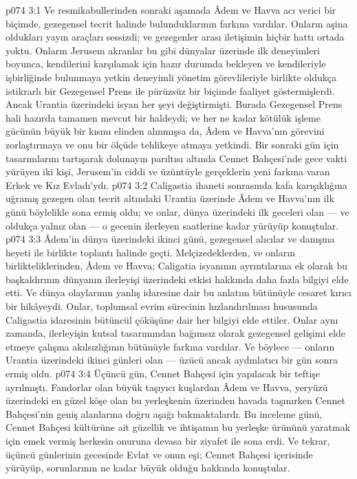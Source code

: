 \vs p074 3:1 Ve resmikabullerinden sonraki aşamada Âdem ve Havva acı verici bir biçimde, gezegensel tecrit halinde bulunduklarının farkına vardılar. Onların aşina oldukları yayın araçları sessizdi; ve gezegenler arası iletişimin hiçbir hattı ortada yoktu. Onların Jerusem akranlar bu gibi dünyalar üzerinde ilk deneyimleri boyunca, kendilerini karşılamak için hazır durumda bekleyen ve kendileriyle işbirliğinde bulunmaya yetkin deneyimli yönetim görevlileriyle birlikte oldukça istikrarlı bir Gezegensel Prens ile pürüzsüz bir biçimde faaliyet göstermişlerdi. Ancak Urantia üzerindeki isyan her şeyi değiştirmişti. Burada Gezegensel Prens hali hazırda tamamen mevcut bir haldeydi; ve her ne kadar kötülük işleme gücünün büyük bir kısmı elinden alınmışsa da, Âdem ve Havva’nın görevini zorlaştırmaya ve onu bir ölçüde tehlikeye atmaya yetkindi. Bir sonraki gün için tasarımlarını tartışarak dolunayın parıltısı altında Cennet Bahçesi’nde gece vakti yürüyen iki kişi, Jerusem’in ciddi ve üzüntüyle gerçeklerin yeni farkına varan Erkek ve Kız Evladı’ydı.
\vs p074 3:2 Caligastia ihaneti sonrasında kafa karışıklığına uğramış gezegen olan tecrit altındaki Urantia üzerinde Âdem ve Havva’nın ilk günü böylelikle sona ermiş oldu; ve onlar, dünya üzerindeki ilk geceleri olan --- ve oldukça yalnız olan --- o gecenin ilerleyen saatlerine kadar yürüyüp konuştular.
\vs p074 3:3 Âdem’in dünya üzerindeki ikinci günü, gezegensel alıcılar ve danışma heyeti ile birlikte toplantı halinde geçti. Melçizedeklerden, ve onların birlikteliklerinden, Âdem ve Havva; Caligatia isyanının ayrıntılarına ek olarak bu başkaldırının dünyanın ilerleyişi üzerindeki etkisi hakkında daha fazla bilgiyi elde etti. Ve dünya olaylarının yanlış idaresine dair bu anlatım bütünüyle cesaret kırıcı bir hikâyeydi. Onlar, toplumsal evrim sürecinin hızlandırılması hususunda Caligastia idaresinin bütüncül çöküşüne dair her bilgiyi elde ettiler. Onlar aynı zamanda, ilerleyişin kutsal tasarımından bağımsız olarak gezegensel gelişimi elde etmeye çalışma akılsızlığının bütünüyle farkına vardılar. Ve böylece --- onların Urantia üzerindeki ikinci günleri olan --- üzücü ancak aydınlatıcı bir gün sonra ermiş oldu.
\vs p074 3:4 Üçüncü gün, Cennet Bahçesi için yapılacak bir teftişe ayrılmıştı. Fandorlar olan büyük taşıyıcı kuşlardan Âdem ve Havva, yeryüzü üzerindeki en güzel köşe olan bu yerleşkenin üzerinden havada taşınırken Cennet Bahçesi’nin geniş alanlarına doğru aşağı bakmaktalardı. Bu inceleme günü, Cennet Bahçesi kültürüne ait güzellik ve ihtişamın bu yerleşke ürününü yaratmak için emek vermiş herkesin onuruna devasa bir ziyafet ile sona erdi. Ve tekrar, üçüncü günlerinin gecesinde Evlat ve onun eşi; Cennet Bahçesi içerisinde yürüyüp, sorunlarının ne kadar büyük olduğu hakkında konuştular.
